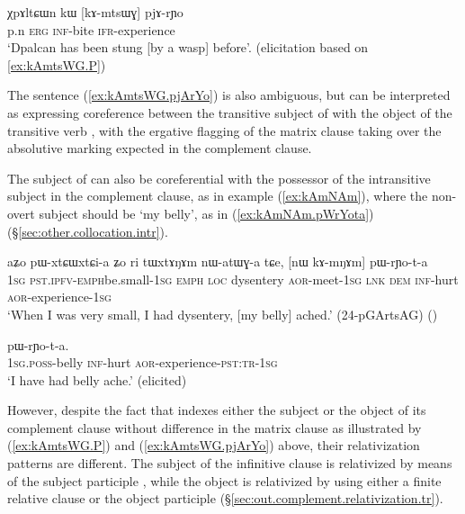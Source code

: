 \begin{exe}
\ex   \label{ex:kAmtsWG.pjArYo} 
\gll χpɤltɕɯn kɯ [kɤ-mtsɯɣ]  pjɤ-rɲo  \\
 p.n \textsc{erg} \textsc{inf}-bite \textsc{ifr}-experience \\
\glt `Dpalcan has been stung [by a wasp] before'. (elicitation based on \ref{ex:kAmtsWG.P})
\end{exe} 

The sentence (\ref{ex:kAmtsWG.pjArYo}) is also ambiguous, but can be interpreted as expressing coreference between the transitive subject of  with the object of the transitive verb , with the ergative flagging of the matrix clause taking over the absolutive marking expected in the complement clause.


The subject of  can also be coreferential with the possessor of the intransitive subject in the complement clause, as in example (\ref{ex:kAmNAm}), where the non-overt subject should be  `my belly', as in (\ref{ex:kAmNAm.pWrYota}) (§\ref{sec:other.collocation.intr}).
 
 \begin{exe}
\ex \label{ex:kAmNAm}
\gll aʑo pɯ-xtɕɯ\redp{}xtɕi-a ʑo ri tɯxtɤŋɤm nɯ-atɯɣ-a tɕe, [nɯ kɤ-mŋɤm] pɯ-rɲo-t-a \\
\textsc{1sg} \textsc{pst}.\textsc{ipfv}-\textsc{emph}\redp{}be.small-\textsc{1sg} \textsc{emph} \textsc{loc} dysentery \textsc{aor}-meet-\textsc{1sg} \textsc{lnk} \textsc{dem} \textsc{inf}-hurt \textsc{aor}-experience-\textsc{1sg} \\
\glt `When I was very small, I had dysentery, [my belly] ached.'  (24-pGArtsAG)
()
\end{exe}

\begin{exe} 
\ex \label{ex:kAmNAm.pWrYota}
 pɯ-rɲo-t-a. \\
\textsc{1sg}.\textsc{poss}-belly \textsc{inf}-hurt \textsc{aor}-experience-\textsc{pst}:\textsc{tr}-\textsc{1sg} \\
\glt `I have had belly ache.' (elicited)
\end{exe} 

However, despite the fact that  indexes either the subject or the object of its complement clause without difference in the matrix clause as illustrated by (\ref{ex:kAmtsWG.P}) and (\ref{ex:kAmtsWG.pjArYo}) above, their relativization patterns are different. The subject of the infinitive clause is relativized by means of the subject participle , while the object is relativized by using either a finite relative clause or the object participle  (§\ref{sec:out.complement.relativization.tr}). 

